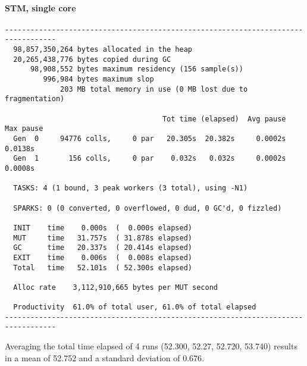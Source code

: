 \paragraph{STM, single core}
\begin{verbatim}
----------------------------------------------------------------------------------
  98,857,350,264 bytes allocated in the heap
  20,265,438,776 bytes copied during GC
      98,908,552 bytes maximum residency (156 sample(s))
         996,984 bytes maximum slop
             203 MB total memory in use (0 MB lost due to fragmentation)

                                     Tot time (elapsed)  Avg pause  Max pause
  Gen  0     94776 colls,     0 par   20.305s  20.382s     0.0002s    0.0138s
  Gen  1       156 colls,     0 par    0.032s   0.032s     0.0002s    0.0008s

  TASKS: 4 (1 bound, 3 peak workers (3 total), using -N1)

  SPARKS: 0 (0 converted, 0 overflowed, 0 dud, 0 GC'd, 0 fizzled)

  INIT    time    0.000s  (  0.000s elapsed)
  MUT     time   31.757s  ( 31.878s elapsed)
  GC      time   20.337s  ( 20.414s elapsed)
  EXIT    time    0.006s  (  0.008s elapsed)
  Total   time   52.101s  ( 52.300s elapsed)

  Alloc rate    3,112,910,665 bytes per MUT second

  Productivity  61.0% of total user, 61.0% of total elapsed
----------------------------------------------------------------------------------
\end{verbatim}

Averaging the total time elapsed of 4 runs (52.300, 52.27, 52.720, 53.740) results in a mean of 52.752 and a standard deviation of 0.676.

